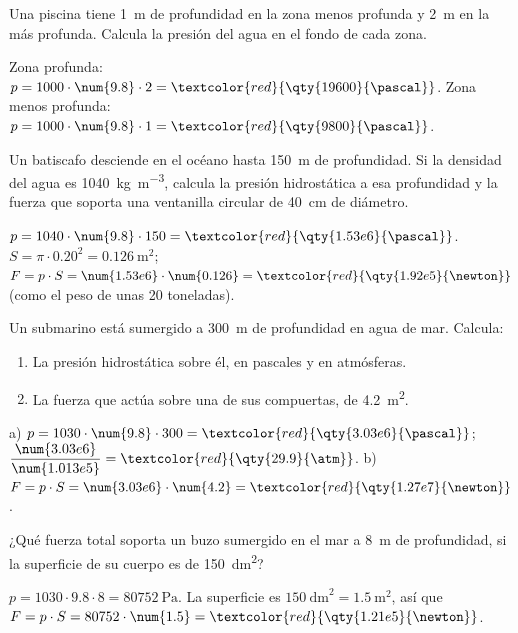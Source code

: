 \begin{exercise}
    Una piscina tiene \qty{1}{\m} de profundidad en la zona menos profunda y \qty{2}{\m} en la más profunda. Calcula la presión del agua en el fondo de cada zona.
    \begin{solu}
        Zona profunda: \(p = 1000 \cdot \num{9.8} \cdot 2 = \textcolor{red}{\qty{19600}{\pascal}}\). Zona menos profunda: \(p = 1000 \cdot \num{9.8} \cdot 1 = \textcolor{red}{\qty{9800}{\pascal}}\).
    \end{solu}
\end{exercise}

\begin{exercise}
    Un batiscafo desciende en el océano hasta \qty{150}{\m} de profundidad. Si la densidad del agua es \qty{1040}{\kg\per\cubic\m}, calcula la presión hidrostática a esa profundidad y la fuerza que soporta una ventanilla circular de \qty{40}{\cm} de diámetro.
    \begin{solu}
        \(p = 1040 \cdot \num{9.8} \cdot 150 = \textcolor{red}{\qty{1.53e6}{\pascal}}\).
        \(S = \pi \cdot \num{0.20}^2 = \qty{0.126}{\square\m}\); \(F = p \cdot S = \num{1.53e6} \cdot \num{0.126} = \textcolor{red}{\qty{1.92e5}{\newton}}\) (como el peso de unas 20 toneladas).
    \end{solu}
\end{exercise}

\begin{exercise}
    Un submarino está sumergido a \qty{300}{\m} de profundidad en agua de mar. Calcula:
    \begin{enumerate}[label=\alph*)]
        \item La presión hidrostática sobre él, en pascales y en atmósferas.
        \item La fuerza que actúa sobre una de sus compuertas, de \qty{4.2}{\square\m}.
    \end{enumerate}
    \begin{solu}
        a) \(p = 1030 \cdot \num{9.8} \cdot 300 = \textcolor{red}{\qty{3.03e6}{\pascal}}\); \(\dfrac{\num{3.03e6}}{\num{1.013e5}} = \textcolor{red}{\qty{29.9}{\atm}}\).
        b) \(F = p \cdot S = \num{3.03e6} \cdot \num{4.2} = \textcolor{red}{\qty{1.27e7}{\newton}}\).
    \end{solu}
\end{exercise}

\begin{exercise}
    ¿Qué fuerza total soporta un buzo sumergido en el mar a \qty{8}{\m} de profundidad, si la superficie de su cuerpo es de \qty{150}{\square\dm}?
    \begin{solu}
        \(p = 1030 \cdot \num{9.8} \cdot 8 = \qty{80752}{\pascal}\). La superficie es \(\qty{150}{\square\dm} = \qty{1.5}{\square\m}\), así que
        \(F = p \cdot S = 80752 \cdot \num{1.5} = \textcolor{red}{\qty{1.21e5}{\newton}}\).
    \end{solu}
\end{exercise}

